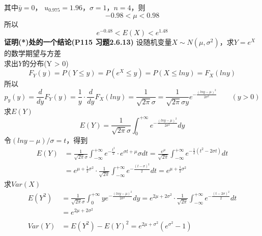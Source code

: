 \documentclass[a4paper]{ctexart}    %
\begin{document}
	其中$ \bar{y} = 0 $， $ u_{0.975} = 1.96 $，$ \sigma = 1 $，$ n = 4 $，则
	\begin{equation*}
		-0.98 < \mu < 0.98
	\end{equation*}
	所以
	\begin{equation*}
		e^{-0.48} < E(X) < e^{1.48}
	\end{equation*}
	\textbf{证明(*)处的一个结论(P115 习题2.6.13)} 设随机变量$ X \sim N(\mu, \sigma^2) $，求$ Y = e^X $的数学期望与方差 \\
	求出$ Y $的分布(Y > 0)
	\begin{equation*}
		F_Y(y) = P(Y \leq y) = P(e^X \leq y) = P(X \leq lny) = F_X(lny)
	\end{equation*}
	所以
	\begin{equation*}
		p_y(y) = \frac{d}{dy}F_Y(y) = \frac{1}{y} \cdot \frac{d}{dy}F_X(lny) = \frac{1}{\sqrt{2\pi}\sigma} = \frac{1}{\sqrt{2\pi}\sigma y} e^{-\frac{(lny-\mu)^2}{2\sigma^2}} \qquad (y > 0)
	\end{equation*}
	求$ E(Y) $
	\begin{equation*}
		E(Y) = \frac{1}{\sqrt{2\pi}\sigma} \int_{0}^{+\infty} e^{-\frac{(lny-\mu)^2}{2\sigma^2}} dy
	\end{equation*}
	令$ (lny - \mu) / \sigma = t $，得到
	\begin{equation*}
		\begin{split}
			E(Y) &= \frac{1}{\sqrt{2\pi}\sigma} \int_{-\infty}^{+\infty} e^{-\frac{t^2}{2}} \cdot e^{\sigma t + \mu}\sigma dt = \frac{e^{\mu}}{\sqrt{2\pi}} \int_{-\infty}^{+\infty} e^{-\frac{1}{2}(t^2-2\sigma t)} dt \\
			&= e^{\mu + \frac{1}{2} \sigma^2} \cdot \frac{1}{\sqrt{2\pi}} \int_{-\infty}^{+\infty} e^{-\frac{(t-\sigma)^2}{2}}dt = e^{\mu + \frac{1}{2}\sigma^2} 
		\end{split}
	\end{equation*}
	求$ Var(X) $
	\begin{equation*}
		\begin{split}
			E(Y^2) &= \frac{1}{\sqrt{2\pi}\sigma} \int_{0}^{+\infty} y e^{-\frac{(lny - \mu)^2}{2\sigma^2}}dy = e^{2\mu + 2\sigma^2} \cdot \frac{1}{\sqrt{2\pi}} \int_{-\infty}^{+\infty} e^{-\frac{(t-2\sigma)^2}{2}}dt \\
			&= e^{2\mu + 2\sigma^2} \\
			& \\
			Var(Y) &= E(Y^2) -E(Y)^2 = e^{2\mu + \sigma^2} (e^{\sigma^2} - 1)
		\end{split}
	\end{equation*}
\end{document}
